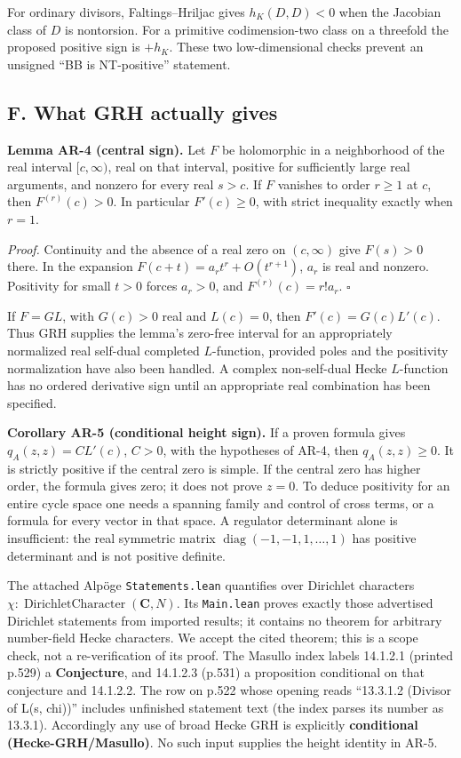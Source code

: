 For ordinary divisors, Faltings--Hriljac gives \(h_K(D,D)<0\) when the
Jacobian class of \(D\) is nontorsion. For a primitive codimension-two
class on a threefold the proposed positive sign is \(+h_K\). These two
low-dimensional checks prevent an unsigned ``BB is NT-positive''
statement.

\subsection{F. What GRH actually
gives}\label{f.-what-grh-actually-gives}

\textbf{Lemma AR-4 (central sign).} Let \(F\) be holomorphic in a
neighborhood of the real interval \([c,\infty)\), real on that interval,
positive for sufficiently large real arguments, and nonzero for every
real \(s>c\). If \(F\) vanishes to order \(r\ge1\) at \(c\), then
\(F^{(r)}(c)>0\). In particular \(F'(c)\ge0\), with strict inequality
exactly when \(r=1\).

\emph{Proof.} Continuity and the absence of a real zero on
\((c,\infty)\) give \(F(s)>0\) there. In the expansion
\(F(c+t)=a_rt^r+O(t^{r+1})\), \(a_r\) is real and nonzero. Positivity
for small \(t>0\) forces \(a_r>0\), and \(F^{(r)}(c)=r!a_r\).
\(\square\)

If \(F=G L\), with \(G(c)>0\) real and \(L(c)=0\), then
\(F'(c)=G(c)L'(c)\). Thus GRH supplies the lemma's zero-free interval
for an appropriately normalized real self-dual completed \(L\)-function,
provided poles and the positivity normalization have also been handled.
A complex non-self-dual Hecke \(L\)-function has no ordered derivative
sign until an appropriate real combination has been specified.

\textbf{Corollary AR-5 (conditional height sign).} If a proven formula
gives \(q_A(z,z)=C L'(c)\), \(C>0\), with the hypotheses of AR-4, then
\(q_A(z,z)\ge0\). It is strictly positive if the central zero is simple.
If the central zero has higher order, the formula gives zero; it does
not prove \(z=0\). To deduce positivity for an entire cycle space one
needs a spanning family and control of cross terms, or a formula for
every vector in that space. A regulator determinant alone is
insufficient: the real symmetric matrix
\(\operatorname{diag}(-1,-1,1,\ldots,1)\) has positive determinant and
is not positive definite.

The attached Alpöge \texttt{Statements.lean} quantifies over Dirichlet
characters \(\chi:\operatorname{DirichletCharacter}(\mathbf C,N)\). Its
\texttt{Main.lean} proves exactly those advertised Dirichlet statements
from imported results; it contains no theorem for arbitrary number-field
Hecke characters. We accept the cited theorem; this is a scope check,
not a re-verification of its proof. The Masullo index labels 14.1.2.1
(printed p.529) a \textbf{Conjecture}, and 14.1.2.3 (p.531) a
proposition conditional on that conjecture and 14.1.2.2. The row on
p.522 whose opening reads ``13.3.1.2 (Divisor of L(s, chi))'' includes
unfinished statement text (the index parses its number as 13.3.1).
Accordingly any use of broad Hecke GRH is explicitly \textbf{conditional
(Hecke-GRH/Masullo)}. No such input supplies the height identity in
AR-5.


